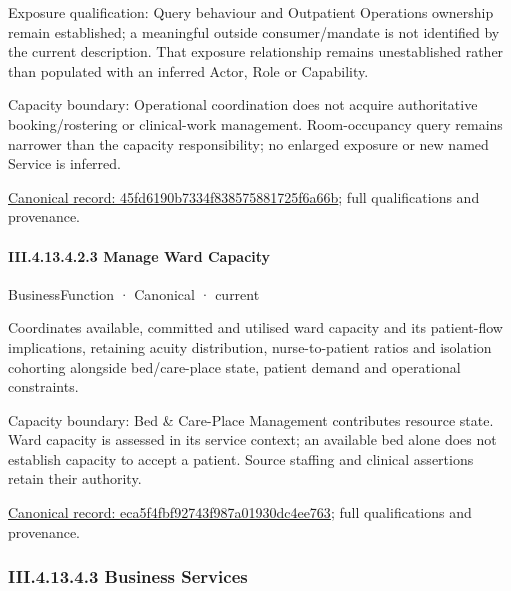 Exposure qualification: Query behaviour and Outpatient Operations ownership remain established; a meaningful outside consumer/mandate is not identified by the current description. That exposure relationship remains unestablished rather than populated with an inferred Actor, Role or Capability.



Capacity boundary: Operational coordination does not acquire authoritative booking/rostering or clinical-work management. Room-occupancy query remains narrower than the capacity responsibility; no enlarged exposure or new named Service is inferred.


{\footnotesize \href{../../../../../../../../continuum/business/business-function/45fd6190b7334f838575881725f6a66b.md}{Canonical record: 45fd6190b7334f838575881725f6a66b}; full qualifications and provenance.}\par
\paragraph*{III.4.13.4.2.3 Manage Ward Capacity}
\label{navigation:III.4.13.4.2.3}

\label{element:eca5f4fbf92743f987a01930dc4ee763}
{\small BusinessFunction · Canonical · current}\par

Coordinates available, committed and utilised ward capacity and its patient-flow implications, retaining acuity distribution, nurse-to-patient ratios and isolation cohorting alongside bed/care-place state, patient demand and operational constraints.



Capacity boundary: Bed \& Care-Place Management contributes resource state. Ward capacity is assessed in its service context; an available bed alone does not establish capacity to accept a patient. Source staffing and clinical assertions retain their authority.


{\footnotesize \href{../../../../../../../../continuum/business/business-function/eca5f4fbf92743f987a01930dc4ee763.md}{Canonical record: eca5f4fbf92743f987a01930dc4ee763}; full qualifications and provenance.}\par
\subsubsection*{III.4.13.4.3 Business Services}
\label{navigation:III.4.13.4.3}

